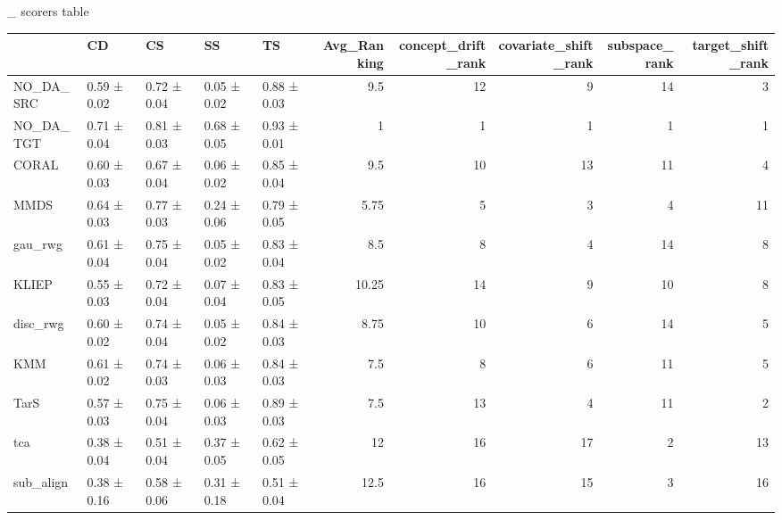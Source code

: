 \sectionsimulated_
\subsectionOther scorers table\begin{tabular}{lllllrrrrr}
\hline
           & CD          & CS          & SS          & TS          &   Avg\_Ranking &   concept\_drift\_rank &   covariate\_shift\_rank &   subspace\_rank &   target\_shift\_rank \\
\hline
 NO\_DA\_SRC & 0.59 ± 0.02 & 0.72 ± 0.04 & 0.05 ± 0.02 & 0.88 ± 0.03 &          9.5  &                   12 &                      9 &              14 &                   3 \\
 NO\_DA\_TGT & 0.71 ± 0.04 & 0.81 ± 0.03 & 0.68 ± 0.05 & 0.93 ± 0.01 &          1    &                    1 &                      1 &               1 &                   1 \\
 CORAL     & 0.60 ± 0.03 & 0.67 ± 0.04 & 0.06 ± 0.02 & 0.85 ± 0.04 &          9.5  &                   10 &                     13 &              11 &                   4 \\
 MMDS      & 0.64 ± 0.03 & 0.77 ± 0.03 & 0.24 ± 0.06 & 0.79 ± 0.05 &          5.75 &                    5 &                      3 &               4 &                  11 \\
 gau\_rwg   & 0.61 ± 0.04 & 0.75 ± 0.04 & 0.05 ± 0.02 & 0.83 ± 0.04 &          8.5  &                    8 &                      4 &              14 &                   8 \\
 KLIEP     & 0.55 ± 0.03 & 0.72 ± 0.04 & 0.07 ± 0.04 & 0.83 ± 0.05 &         10.25 &                   14 &                      9 &              10 &                   8 \\
 disc\_rwg  & 0.60 ± 0.02 & 0.74 ± 0.04 & 0.05 ± 0.02 & 0.84 ± 0.03 &          8.75 &                   10 &                      6 &              14 &                   5 \\
 KMM       & 0.61 ± 0.02 & 0.74 ± 0.03 & 0.06 ± 0.03 & 0.84 ± 0.03 &          7.5  &                    8 &                      6 &              11 &                   5 \\
 TarS      & 0.57 ± 0.03 & 0.75 ± 0.04 & 0.06 ± 0.03 & 0.89 ± 0.03 &          7.5  &                   13 &                      4 &              11 &                   2 \\
 tca       & 0.38 ± 0.04 & 0.51 ± 0.04 & 0.37 ± 0.05 & 0.62 ± 0.05 &         12    &                   16 &                     17 &               2 &                  13 \\
 sub\_align & 0.38 ± 0.16 & 0.58 ± 0.06 & 0.31 ± 0.18 & 0.51 ± 0.04 &         12.5  &                   16 &                     15 &               3 &                  16 \\

\end{tabular}
